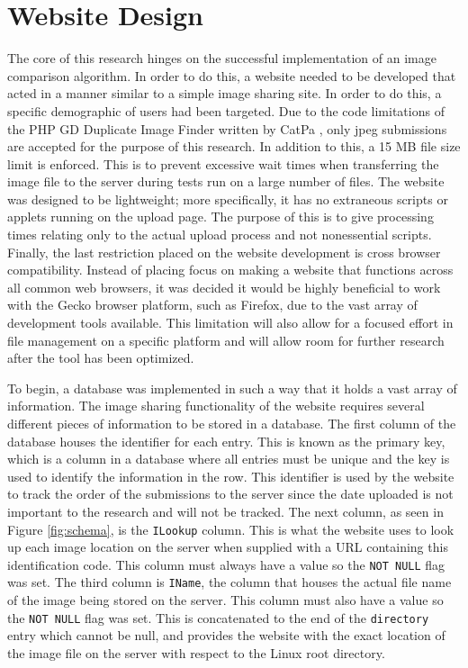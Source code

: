 \section{Website Design} \label{sec:websitedesign}
The core of this research hinges on the successful implementation of an image comparison algorithm. In order to do this, a website needed to be developed that acted in a manner similar to a simple image sharing site. In order to do this, a specific demographic of users had been targeted. Due to the code limitations of the PHP GD Duplicate Image Finder written by CatPa \cite{catpa:gdcode}, only jpeg submissions are accepted for the purpose of this research. In addition to this, a 15 MB file size limit is enforced. This is to prevent excessive wait times when transferring the image file to the server during tests run on a large number of files. The website was designed to be lightweight; more specifically, it has no extraneous scripts or applets running on the upload page. The purpose of this is to give processing times relating only to the actual upload process and not nonessential scripts. Finally, the last restriction placed on the website development is cross browser compatibility. Instead of placing focus on making a website that functions across all common web browsers, it was decided it would be highly beneficial to work with the Gecko browser platform, such as Firefox, due to the vast array of development tools available. This limitation will also allow for a focused effort in file management on a specific platform and will allow room for further research after the tool has been optimized.

To begin, a database was implemented in such a way that it holds a vast array of information. The image sharing functionality of the website requires several different pieces of information to be stored in a database. The first column of the database houses the identifier for each entry. This is known as the primary key, which is a column in a database where all entries must be unique and the key is used to identify the information in the row. This identifier is used by the website to track the order of the submissions to the server since the date uploaded is not important to the research and will not be tracked. The next column, as seen in Figure \ref{fig:schema}, is the {\tt ILookup} column. This is what the website uses to look up each image location on the server when supplied with a URL containing this identification code. This column must always have a value so the {\tt NOT NULL} flag was set. The third column is {\tt IName}, the column that houses the actual file name of the image being stored on the server. This column must also have a value so the {\tt NOT NULL} flag was set. This is concatenated to the end of the {\tt directory} entry which cannot be null, and provides the website with the exact location of the image file on the server with respect to the Linux root directory.


